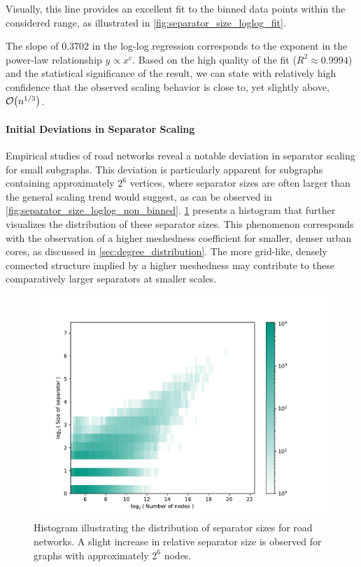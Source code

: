 Visually, this line provides an excellent fit to the binned data points within the considered range, as illustrated in \cref{fig:separator_size_loglog_fit}.

The slope of \( 0.3702 \) in the log-log regression corresponds to the exponent in the power-law relationship \( y \propto x^c \).
Based on the high quality of the fit (\( R^2 \approx 0.9994 \)) and the statistical significance of the result, we can state with relatively high confidence that the observed scaling behavior is close to, yet slightly above, \( \mathcal{O}\!\left(n^{1/3}\right) \).

\paragraph{Initial Deviations in Separator Scaling}

Empirical studies of road networks reveal a notable deviation in separator scaling for small subgraphs.
This deviation is particularly apparent for subgraphs containing approximately \(2^6\) vertices, where separator sizes are often larger than the general scaling trend would suggest, as can be observed in \cref{fig:separator_size_loglog_non_binned}.
\cref{fig:real_europe_hist} presents a histogram that further visualizes the distribution of these separator sizes.
This phenomenon corresponds with the observation of a higher meshedness coefficient for smaller, denser urban cores, as discussed in \cref{sec:degree_distribution}.
The more grid-like, densely connected structure implied by a higher meshedness may contribute to these comparatively larger separators at smaller scales.

\begin{figure}[tbhp]
    \centering
    \includegraphics[width=0.7\linewidth]{graphics/Germany-hist.pdf}
    \caption{Histogram illustrating the distribution of separator sizes for road networks. A slight increase in relative separator size is observed for graphs with approximately \(2^6\) nodes.}
    \label{fig:real_europe_hist}
\end{figure}












